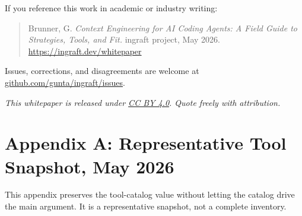 \documentclass[
  11pt,
  letterpaper,
  numbers=noendperiod,
  parskip=half]{scrartcl}
\begin{document}
\begin{tcolorbox}[enhanced jigsaw, arc=.35mm, bottomrule=.15mm, bottomtitle=1mm, breakable, colback=white, colbacktitle=paper-callout-tip-color!10!white, colframe=paper-callout-tip-color-frame, coltitle=black, left=2mm, leftrule=.75mm, opacityback=0, opacitybacktitle=0.6, rightrule=.15mm, title=\textcolor{paper-callout-tip-color}{\faLightbulb}\hspace{0.5em}{Citation}, titlerule=0mm, toprule=.15mm, toptitle=1mm]

If you reference this work in academic or industry writing:

\begin{quote}
Brunner, G. \emph{Context Engineering for AI Coding Agents: A Field
Guide to Strategies, Tools, and Fit.} ingraft project, May 2026.
\url{https://ingraft.dev/whitepaper}
\end{quote}

Issues, corrections, and disagreements are welcome at
\href{https://github.com/gunta/ingraft/issues}{github.com/gunta/ingraft/issues}.

\end{tcolorbox}

\emph{This whitepaper is released under
\href{https://creativecommons.org/licenses/by/4.0/}{CC BY 4.0}. Quote
freely with attribution.}

\section{Appendix A: Representative Tool Snapshot, May
2026}\label{sec-tools-appendix}

This appendix preserves the tool-catalog value without letting the
catalog drive the main argument. It is a representative snapshot, not a
complete inventory.

\figureToolLandscapeCounts
\end{document}
